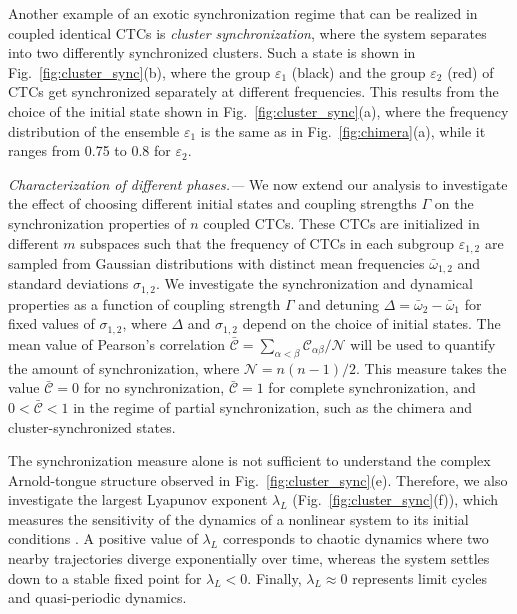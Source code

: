 \documentclass[pra,aps,twocolumn,superscriptaddress,notitlepage]{revtex4-1}
\begin{document}
	Another example of an exotic synchronization regime that can be realized in coupled identical CTCs is \textit{cluster synchronization}, where the system separates into two differently synchronized clusters. Such a state is shown in Fig.~\ref{fig:cluster_sync}(b), where the group $\varepsilon_1$ (black) and the group $\varepsilon_2$ (red) of CTCs get synchronized separately at different frequencies. 
	This results from the choice of the initial state shown in Fig.~\ref{fig:cluster_sync}(a), where the frequency distribution of the ensemble $\varepsilon_1$ is the same as in Fig.~\ref{fig:chimera}(a), while it ranges from 0.75 to 0.8 for $\varepsilon_2$. 
	
	
	\noindent \textit{Characterization of different phases.---}
	We now extend our analysis to investigate the effect of choosing different initial states and coupling strengths $\Gamma$ on the synchronization properties of $n$ coupled CTCs. 
	These CTCs are initialized in different $m$ subspaces such that the frequency of CTCs in each subgroup $\varepsilon_{1,2}$ are sampled from Gaussian distributions with distinct mean frequencies $\bar{\omega}_{1,2}$ and standard deviations $\sigma_{1,2}$.
	We investigate the synchronization and dynamical properties as a function of coupling strength $\Gamma$ and detuning $\Delta=\bar{\omega}_2-\bar{\omega}_1$ for fixed values of $\sigma_{1,2}$, where $\Delta$ and  $\sigma_{1,2}$ depend on the choice of initial states. 
	The mean value of Pearson’s correlation $\bar{\mathcal{C}}=\sum_{\alpha < \beta } \mathcal{C}_{\alpha \beta }/\mathcal{N}$ will be used to quantify the amount of synchronization, where $\mathcal{N}=n(n-1)/2$. 
	This measure takes the value $\bar{\mathcal{C}}=0$ for no synchronization, $\bar{\mathcal{C}}=1$ for complete synchronization, and $0<\bar{\mathcal{C}}<1$ in the regime of partial synchronization, such as the chimera and cluster-synchronized states.
	
	The synchronization measure alone is not sufficient to understand the complex Arnold-tongue structure observed in Fig.~\ref{fig:cluster_sync}(e). 
	Therefore, we also investigate the largest Lyapunov exponent $\lambda_L$ (Fig.~\ref{fig:cluster_sync}(f)), which measures the sensitivity of the dynamics of a nonlinear system to its initial conditions \cite{NLD1, NLD2}.
	A positive value of $\lambda_L$ corresponds to chaotic dynamics where two nearby trajectories diverge exponentially over time,
	whereas the system settles down to a stable fixed point for $\lambda_L<0$.
	Finally, $\lambda_L \approx 0$ represents limit cycles and quasi-periodic dynamics. 
	
\end{document}
